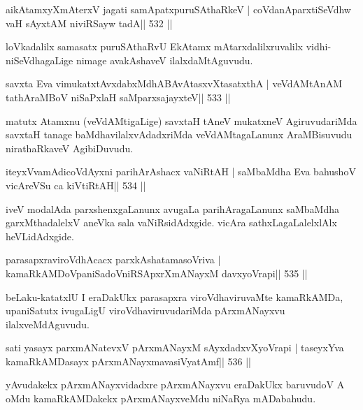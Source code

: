 \begin{shl}
aikAtamxyXmAterxV jagati samApatxpuruSAthaRkeV |
coVdanAparxtiSeVdhw vaH sAyxtAM niviRSayw tadA\hfill || 532 ||
\end{shl}

\begin{artha}
loVkadalilx samasatx puruSAthaRvU EkAtamx mAtarxdalilxruvalilx vidhi-niSeVdhagaLige nimage avakAshaveV ilalxdaMtAguvudu.
\end{artha}

\begin{shl}
savxta Eva vimukatxtAvxdabxMdhABAvAtasxvXtasatxthA |
veVdAMtAnAM tathA\s\s raMBoV niSaPxlaH saMparxsajayxteV\hfill || 533 ||
\end{shl}

\begin{artha}
matutx Atamxnu (veVdAMtigaLige) savxtaH tAneV mukatxneV AgiruvudariMda savxtaH tanage baMdhavilalxvAdadxriMda veVdAMtagaLanunx AraMBisuvudu nirathaRkaveV AgibiDuvudu.
\end{artha}

\begin{shl}
iteyxVvamAdicoVdAyxni parihArAshacx vaNiRtAH |
saMbaMdha Eva bahushoV vicAreVSu ca kiVtiRtAH\hfill || 534 ||
\end{shl}

\begin{artha}
iveV modalAda parxshenxgaLanunx avugaLa parihAragaLanunx saMbaMdha
garxMthadalelxV aneVka sala vaNiRsidAdxgide. vicAra sathxLagaLalelxlAlx 
heVLidAdxgide.
\end{artha}

\begin{shl}
parasapxraviroVdhAcacx parxkAshatamasoVriva |
kamaRkAMDoVpaniSadoVniRSApxrXmANayxM davxyoVrapi\hfill || 535 ||
\end{shl}

\begin{artha}
beLaku-katatxlU I eraDakUkx parasapxra viroVdhaviruvaMte
kamaRkAMDa, upaniSatutx ivugaLigU viroVdhaviruvudariMda pArxmANayxvu ilalxveMdAguvudu.
\end{artha}

\begin{shl}
sati yasayx parxmANatevxV pArxmANayxM sAyxdadxvXyoVrapi |
taseyxYva kamaRkAMDasayx pArxmANayxmavasiVyatAmf\hfill || 536 ||
\end{shl}

\begin{artha}
yAvudakekx pArxmANayxvidadxre pArxmANayxvu eraDakUkx baruvudoV A oMdu
kamaRkAMDakekx pArxmANayxveMdu niNaRya mADabahudu.
\end{artha}

